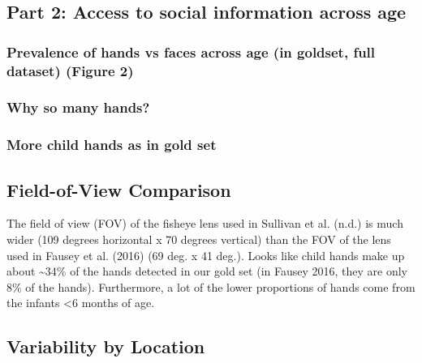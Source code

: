 \documentclass[10pt, letterpaper]{article}
\begin{document}
\hypertarget{part-2-access-to-social-information-across-age}{%
\subsection{Part 2: Access to social information across
age}\label{part-2-access-to-social-information-across-age}}

\hypertarget{prevalence-of-hands-vs-faces-across-age-in-goldset-full-dataset-figure-2}{%
\subsubsection{Prevalence of hands vs faces across age (in goldset, full
dataset) (Figure
2)}\label{prevalence-of-hands-vs-faces-across-age-in-goldset-full-dataset-figure-2}}

\hypertarget{why-so-many-hands}{%
\subsubsection{Why so many hands?}\label{why-so-many-hands}}

\hypertarget{more-child-hands-as-in-gold-set}{%
\subsubsection{More child hands as in gold
set}\label{more-child-hands-as-in-gold-set}}

\hypertarget{field-of-view-comparison}{%
\subsection{Field-of-View Comparison}\label{field-of-view-comparison}}

The field of view (FOV) of the fisheye lens used in Sullivan et al.
(n.d.) is much wider (109 degrees horizontal x 70 degrees vertical) than
the FOV of the lens used in Fausey et al. (2016) (69 deg. x 41 deg.).
Looks like child hands make up about \textasciitilde{}34\% of the hands
detected in our gold set (in Fausey 2016, they are only 8\% of the
hands). Furthermore, a lot of the lower proportions of hands come from
the infants \textless{}6 months of age.

\hypertarget{variability-by-location}{%
\subsection{Variability by Location}\label{variability-by-location}}
\end{document}
